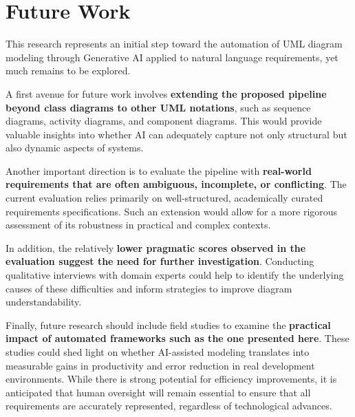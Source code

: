 \section{Future Work} 

This research represents an initial step toward the automation of UML diagram modeling through Generative AI applied to natural language requirements, yet much remains to be explored.

A first avenue for future work involves \textbf{extending the proposed pipeline beyond class diagrams to other UML notations}, such as sequence diagrams, activity diagrams, and component diagrams. This would provide valuable insights into whether AI can adequately capture not only structural but also dynamic aspects of systems.

Another important direction is to evaluate the pipeline with \textbf{real-world requirements that are often ambiguous, incomplete, or conflicting}. The current evaluation relies primarily on well-structured, academically curated requirements specifications. Such an extension would allow for a more rigorous assessment of its robustness in practical and complex contexts.

In addition, the relatively \textbf{lower pragmatic scores observed in the evaluation suggest the need for further investigation}. Conducting qualitative interviews with domain experts could help to identify the underlying causes of these difficulties and inform strategies to improve diagram understandability.

Finally, future research should include field studies to examine the \textbf{practical impact of automated frameworks such as the one presented here}. These studies could shed light on whether AI-assisted modeling translates into measurable gains in productivity and error reduction in real development environments. While there is strong potential for efficiency improvements, it is anticipated that human oversight will remain essential to ensure that all requirements are accurately represented, regardless of technological advances.